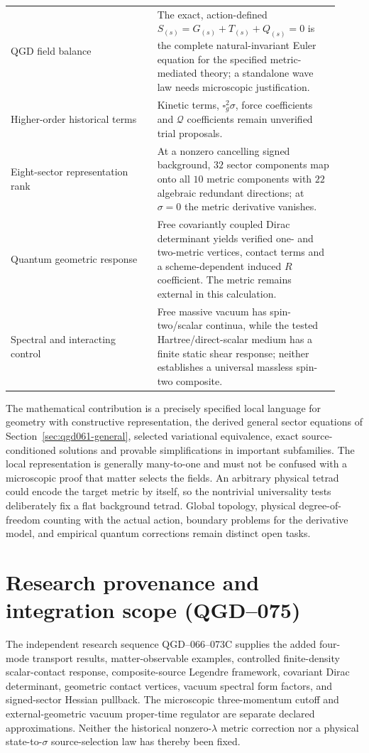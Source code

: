 \documentclass[11pt,a4paper]{article}
\begin{document}
\begin{longtable}{@{}p{0.41\linewidth}p{0.51\linewidth}@{}}
QGD field balance & The exact, action-defined $S_{(s)}=G_{(s)}+T_{(s)}+Q_{(s)}=0$ is the complete natural-invariant Euler equation for the specified metric-mediated theory; a standalone wave law needs microscopic justification.\\
Higher-order historical terms & Kinetic terms, \(\square_g^2\sigma\), force coefficients and \(\mathcal Q\) coefficients remain unverified trial proposals.\\\midrule
Eight-sector representation rank & At a nonzero cancelling signed background, $32$ sector components map onto all $10$ metric components with $22$ algebraic redundant directions; at $\sigma=0$ the metric derivative vanishes.\\
Quantum geometric response & Free covariantly coupled Dirac determinant yields verified one- and two-metric vertices, contact terms and a scheme-dependent induced $R$ coefficient. The metric remains external in this calculation.\\
Spectral and interacting control & Free massive vacuum has spin-two/scalar continua, while the tested Hartree/direct-scalar medium has a finite static shear response; neither establishes a universal massless spin-two composite.\\
\bottomrule
\end{longtable}
The mathematical contribution is a precisely specified local language for geometry with constructive representation, the derived general sector equations of Section~\ref{sec:qgd061-general}, selected variational equivalence, exact source-conditioned solutions and provable simplifications in important subfamilies. The local representation is generally many-to-one and must not be confused with a microscopic proof that matter selects the fields. An arbitrary physical tetrad could encode the target metric by itself, so the nontrivial universality tests deliberately fix a flat background tetrad. Global topology, physical degree-of-freedom counting with the actual action, boundary problems for the derivative model, and empirical quantum corrections remain distinct open tasks.


\section{Research provenance and integration scope (QGD--075)}\label{sec:qgd075-source-archive}
The independent research sequence QGD--066--073C supplies the added
four-mode transport results, matter-observable examples, controlled
finite-density scalar-contact response, composite-source Legendre
framework, covariant Dirac determinant, geometric contact vertices,
vacuum spectral form factors, and signed-sector Hessian pullback.
The microscopic three-momentum cutoff and external-geometric vacuum
proper-time regulator are separate declared approximations. Neither
the historical nonzero-$\lambda$ metric correction nor a physical
state-to-$\sigma$ source-selection law has thereby been fixed.
\end{document}
